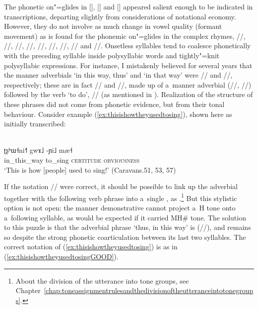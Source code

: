 			The phonetic on"=glides in [{\kern1.3pt}], [] and [] appeared salient enough to be
			indicated in transcriptions, departing slightly from considerations of notational economy. However, they do not involve as much change in vowel quality (formant movement) as is found for the
			phonemic on"=glides in the complex rhymes, //, //, //, //, //,
			//, //, // and //. Onsetless
			syllables tend to coalesce phonetically with the preceding syllable inside polysyllabic words and tightly"=knit polysyllabic
			expressions. For instance, I mistakenly believed for several years that the manner adverbials ‘in this
			way, thus’ and ‘in that way’ were // and //, respectively; these are in
			fact // and //, made up of a~manner {adverbial} (//, //) followed by the verb ‘to do’, // (as mentioned in ). Realization of the 
			structure of these phrases did not come from phonetic evidence, but from their tonal
			behaviour. Consider example (\ref{ex:thisishowtheyusedtosing}), shown here as initially transcribed:
			\begin{exe}
				\ex
				\label{ex:thisishowtheyusedtosing}
				\\
				\gll ʈʂʰɯ˧ni˧˥ gwɤ˩ -ɲi˩ mæ˧\\
				in\_this\_way to\_sing \textsc{certitude} \textsc{obviousness}\\
				\glt ‘This is how [people] used to sing!’ (Caravans.51, 53, 57)
			\end{exe}
			
			If the notation // were correct, it should be possible to link up the {adverbial}
			together with the following verb phrase into a~single , as .\footnote{About the division of the utterance into tone groups, see Chapter~\ref{chap:toneassignmentrulesandthedivisionoftheutteranceintotonegroups}.} But this stylistic option is not open: the manner demonstrative cannot project a~H tone onto a~following
			syllable, as would be expected if it carried MH\# tone. The solution to this puzzle is that the {adverbial} phrase ‘thus, in this way’ is  (//), and remains so despite the strong phonetic {coarticulation} between its last two
			syllables. The correct notation of
			(\ref{ex:thisishowtheyusedtosing}) is as in (\ref{ex:thisishowtheyusedtosingGOOD}). 
			
